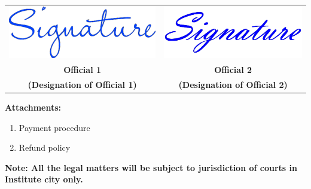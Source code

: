\documentclass[12pt]{article}
\begin{document}
\begin{center}
\begin{tabularx}{\textwidth}{CC}
\includegraphics[scale=0.22]{signature1} &
\includegraphics[scale=0.22]{signature2} \\
\textbf{Official 1} & \textbf{Official 2} \\
\textbf{(Designation of Official 1)} 
& \textbf{(Designation of Official 2)}
\end{tabularx}
\end{center}
%
\vspace{-1em}
\textbf{Attachments:} \vspace{-1em}
\begin{enumerate}
\setlength{\itemsep}{0pt}
\item Payment procedure
\item Refund policy
\end{enumerate}
%

\vfill
{\centering \textbf{\small Note: All the legal matters will be subject 
to jurisdiction of courts in Institute city only.}\par} 


\end{document}
